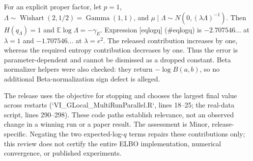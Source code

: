\documentclass[10pt]{article}
\begin{document}
For an explicit proper factor, let \(p=1\), \(\Lambda\sim\operatorname{Wishart}(2,1/2)=\operatorname{Gamma}(1,1)\), and \(\mu\mid\Lambda\sim N(0,(\lambda\Lambda)^{-1})\). Then \(H(q_\Lambda)=1\) and \(\mathbb E\log\Lambda=-\gamma_E\). Expression [eqlogq] (\#eqlogq) is \(-2.707546\ldots\) at \(\lambda=1\) and \(-1.707546\ldots\) at \(\lambda=e^2\). The released contribution increases by one, whereas the required entropy contribution decreases by one. Thus the error is parameter-dependent and cannot be dismissed as a dropped constant. Beta normalizer helpers were also checked: they return \(-\log B(a,b)\), so no additional Beta-normalization sign defect is alleged.\par
The release uses the objective for stopping and chooses the largest final value across restarts (`VI\_GLocal\_MultiRunParallel.R`, lines 18–25; the real-data script, lines 290–298). These code paths establish relevance, not an observed change in a winning run or a paper result. The assessment is Minor, release-specific. Negating the two expected-log-\(q\) terms repairs these contributions only; this review does not certify the entire ELBO implementation, numerical convergence, or published experiments.\par
\end{document}
